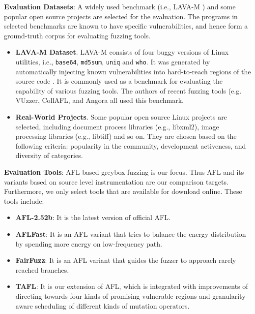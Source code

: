 \textbf{Evaluation Datasets}: A widely used benchmark (i.e., LAVA-M ) and some popular open source projects are selected for the evaluation. The programs in selected benchmarks are known to have specific vulnerabilities, and hence form a ground-truth corpus for evaluating fuzzing tools.
\begin{itemize}

   \item \textbf{LAVA-M Dataset}. LAVA-M consists of four buggy versions of Linux utilities, i.e., \texttt{base64}, \texttt{md5sum}, \texttt{uniq} and \texttt{who}. It was generated by automatically injecting known vulnerabilities into hard-to-reach regions of the source code \cite{lava}. It is commonly used as a benchmark for evaluating the capability of various fuzzing tools. The authors of recent fuzzing tools (e.g. VUzzer\cite{rawat2017vuzzer}, CollAFL\cite{gancollafl}, and Angora \cite{chen2018angora} all used this benchmark.
        
    \item \textbf{Real-World Projects}. Some popular open source Linux projects are selected, including document process libraries (e.g., libxml2), image processing libraries (e.g., libtiff) and so on. They are chosen based on the following criteria: popularity in the community, development activeness, and diversity of categories.  
\end{itemize}


\textbf{Evaluation Tools}: AFL based greybox fuzzing is our focus. Thus AFL and its variants based on source level instrumentation are our comparison targets.  Furthermore, we only select tools that are available for download online. These tools include:
    
\begin{itemize}

    \item \textbf{AFL-2.52b}:  It is the latest version of official AFL.
    
    \item \textbf{AFLFast}: It is an AFL variant that tries to balance the energy distribution by spending more energy on low-frequency path.
    
    \item \textbf{FairFuzz}: It is an AFL variant that guides the fuzzer to approach rarely reached branches.
    
    \item \textbf{TAFL}: It is our extension of AFL, which is integrated with improvements of directing towards four kinds of promising vulnerable regions and granularity-aware scheduling of different kinds of mutation operators. 
\end{itemize}


